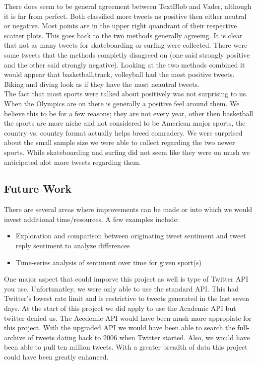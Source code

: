 \documentclass[12pt]{article}
\begin{document}
        There does seem to be general agreement between TextBlob and Vader, although it is far from perfect. Both classified more tweets as positive then either neutral or negative. Most 
        points are in the upper right quandrant of their respective scatter plots. This goes back to the two methods generally agreeing. It is clear that not as many tweets for skateboarding 
        or surfing were collected. There were some tweets that the methods completly disagreed on (one said strongly positive and the other said strongly negative). Looking at the two 
        methods combined it would appear that basketball,track, volleyball had the most positive tweets. Biking and diving look as if they have the most neautral tweets. \\

        The fact that most sports were talked about positively was not surprising to us. When the Olympics are on there is generally a positive feel around them. We believe this to be 
        for a few reasons; they are not every year, other then basketball the sports are more niche and not considered to be American major sports, the country vs. country format 
        actually helps breed comradery. We were surprised about the small sample size we were able to collect regarding the two newer sports. While skateboarding and surfing did not 
        seem like they were on mush we anticipated alot more tweets regarding them. \\


        \subsection{Future Work}
        There are several areas where improvements can be made or into which we would invest additional time/resources. A few examples include:

        \begin{itemize}
            \item Exploration and comparison between originating tweet sentiment and tweet reply sentiment to analyze differences
            \item Time-series analysis of sentiment over time for given sport(s)
        \end{itemize}

        One major aspect that could imporve this project as well is type of Twitter API you use. Unfortunatley, we were only able to use the standard API. This had Twitter's lowest rate 
        limit and is restrictive to tweets generated in the last seven days. At the start of this project we did apply to use the Academic API but twitter denied us. The Acedemic API would 
        have been mush more appropiate for this project. With the upgraded API we would have been able to search the full-archive of tweets dating back to 2006 when Twitter started. Also, 
        we would have been able to pull ten million tweets. With a greater breadth of data this project could have been greatly enhanced.
\end{document}
